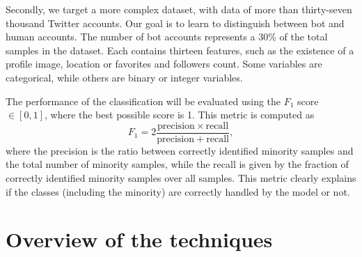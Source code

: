 \documentclass[conference]{IEEEtran}
\begin{document}
		Secondly, we target a more complex dataset, with data of more than thirty-seven thousand Twitter accounts. Our goal is to learn to distinguish between bot and human accounts. The number of bot accounts represents a 30\% of the total samples in the dataset. Each contains thirteen features, such as the existence of a profile image, location or favorites and followers count. Some variables are categorical, while others are binary or integer variables.

		The performance of the classification will be evaluated using the $F_1$ score $\in [0, 1]$, where the best possible score is 1. This metric is computed as
			\begin{equation*}
				F_1 = 2\frac{\mathrm{precision}\times\mathrm{recall}}{\mathrm{precision}+\mathrm{recall}},
			\end{equation*}
where the precision is the ratio between correctly identified minority samples and the total number of minority samples, while the recall is given by the fraction of correctly identified minority samples over all samples. This metric clearly explains if the classes (including the minority) are correctly handled by the model or not.


\section{Overview of the techniques}
\end{document}

